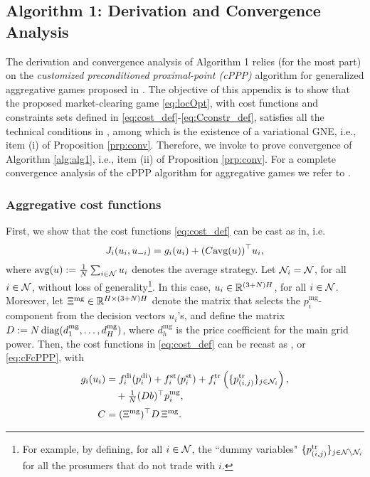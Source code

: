 \appendix%
\subsection{Algorithm 1: Derivation and Convergence Analysis}
\label{app:CA}
The derivation and convergence analysis of Algorithm 1 relies (for the most part) on the \textit{customized preconditioned proximal-point (cPPP)} algorithm for generalized aggregative games proposed in \cite[Algorithm~6]{belgioioso2020semi}. The objective of this appendix is to show that the proposed market-clearing game \eqref{eq:locOpt}, with cost functions and constraints sets defined in \eqref{eq:cost_def}-\eqref{eq:Cconstr_def}, satisfies all the technical conditions in \cite[Theorem~2]{belgioioso2020semi}, among which is the existence of a variational GNE, i.e., item (i) of Proposition \ref{prp:conv}. Therefore, we invoke \cite[Theorem~2]{belgioioso2020semi} to prove convergence of Algorithm \ref{alg:alg1}, i.e., item (ii) of Proposition \ref{prp:conv}. For a complete convergence analysis of the cPPP algorithm for aggregative games we refer to \cite[Appendix~C]{belgioioso2020semi}.

\smallskip
\subsubsection*{Aggregative cost functions} First, we show that the cost functions \eqref{eq:cost_def} can be cast as in\cite[Eqn.~(30)]{belgioioso2020semi}, i.e.
\begin{equation}
	\label{eq:cFcPPP}
	J_i(u_i, u_{-i}) = g_i(u_i) + {(C \avg( u))}^\top u_i,
\end{equation}
where $\textrm{avg}( u) := \frac{1}{N}\sum_{i \in \mathcal N} u_i$ denotes the average strategy.
Let $\mathcal N_i = \mathcal N$, for all $i \in \mathcal N$, without loss of generality\footnote{For example, by defining, for all $i \in \mathcal N$, the ``dummy variables" $\{p^{\text{tr}}_{(i,j)}\}_{j \in \mathcal N \setminus {\mathcal N_i}}$ for all the prosumers that do not trade with $i$.}. In this case, $u_i \in \mathbb R^{(3+N)H}$, for all $i \in \mathcal N$. Moreover, let $\Xi^{\text{mg}} \in \mathbb R^{H \times (3+N)H}$ denote the matrix that selects the $p_{i}^{\text{mg}}$-component from the decision vectors $u_i$'s, and define the matrix $D:= N \operatorname{diag}(d^{\text{mg}}_1, \ldots, d^{\text{mg}}_H)$, where $d^{\text{mg}}_h$ is the price coefficient for the main grid power. Then, the cost functions in \eqref{eq:cost_def} can be recast as \cite[Eqn.~(30)]{belgioioso2020semi}, or \eqref{eq:cFcPPP}, with
\begin{subequations}
	\label{eq:pieces_cPPP}
	\begin{align}
		g_i(u_i) &= \nonumber
		f_{i}^{\mathrm{di}}(p_{i}^{\mathrm{di}}) + f_{i}^{\mathrm{st}}(p_{i}^{\mathrm{st}})+ f_{i}^{\mathrm{tr}} \left( \{ p_{(i,j)}^{\mathrm{tr}} \}_{j \in \mc N_i} \right),\\[-.2em]
		\label{eq:gi_cPPP}
		&
		\textstyle
		\quad +\frac{1}{N}(Db)^\top p_i^{\text{mg}},\\[.2em]
		C &= (\Xi^{\text{mg}})^\top D \, \Xi^{\text{mg}}.
		\label{eq:C_cPPP}
	\end{align}
\end{subequations}


